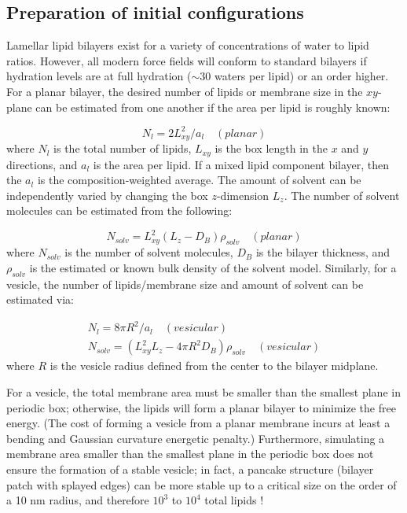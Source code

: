 \documentclass[9pt,bestpractices]{livecoms}
\begin{document}
\subsection{Preparation of initial configurations}
\label{prepconf3}
Lamellar lipid bilayers exist for a variety of concentrations of water to lipid ratios.
However, all modern force fields will conform to standard bilayers if hydration levels are at full hydration ($\sim$30 waters per lipid) or an order higher.
For a planar bilayer, the desired number of lipids or membrane size in the $xy$-plane can be estimated from one another if the area per lipid is roughly known:

\begin{equation}\label{eq:2}
	N_l = 2 L_{xy}^2/a_l \quad (planar)
\end{equation}
where $N_l$ is the total number of lipids, $L_{xy}$ is the box length in the $x$ and $y$ directions, and $a_l$ is the area per lipid.
If a mixed lipid component bilayer, then the $a_l$ is the composition-weighted average.
The amount of solvent can be independently varied by changing the box $z$-dimension $L_z$. The number of solvent molecules can be estimated from the following:

\begin{equation}\label{eq:3}
	N_{solv} = L_{xy}^2 (L_z - D_B) \rho_{solv} \quad (planar)
\end{equation}
where $N_{solv}$ is the number of solvent molecules, $D_B$ is the bilayer thickness, and $\rho_{solv}$ is the estimated or known bulk density of the solvent model. Similarly, for a vesicle, the number of lipids/membrane size and amount of solvent can be estimated via:

\begin{subequations}\label{eq:4}
\begin{align}
N_l = 8 \pi R^2/a_l \quad (vesicular)\label{eq:4a} \\
N_{solv} = (L_{xy}^2 L_z - 4\pi R^2 D_B) \rho_{solv} \quad (vesicular)\label{eq:4b}
\end{align}
\end{subequations}
where $R$ is the vesicle radius defined from the center to the bilayer midplane.

For a vesicle, the total membrane area must be smaller than the smallest plane in periodic box; otherwise, the lipids will form a planar bilayer to minimize the free energy.
(The cost of forming a vesicle from a planar membrane incurs at least a bending and Gaussian curvature energetic penalty.)
Furthermore, simulating a membrane area smaller than the smallest plane in the periodic box does not ensure the formation of a stable vesicle; in fact, a pancake structure (bilayer patch with splayed edges) can be more stable up to a critical size on the order of a 10 nm radius, and therefore $10^3$ to $10^4$ total lipids \cite{Deserno2009}!
\end{document}
